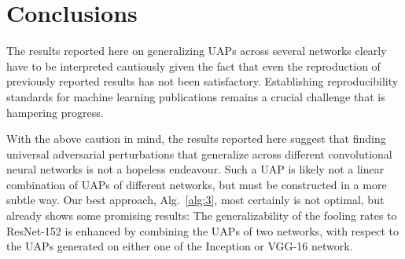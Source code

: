 \documentclass[runningheads]{llncs}
\begin{document}
\section{Conclusions}
The results reported here on generalizing UAPs across several networks clearly have to be interpreted cautiously given the fact that even the reproduction of previously reported results has not been satisfactory. Establishing reproducibility standards for machine learning publications remains a crucial challenge that is hampering progress.

With the above caution in mind, the results reported here suggest that finding universal adversarial perturbations that generalize across different convolutional neural networks is not a hopeless endeavour. Such a UAP is likely not a linear combination of UAPs of different networks, but must be constructed in a more subtle way. Our best approach, Alg.~\ref{alg:3}, most certainly is not optimal, but already shows some promising results: The generalizability of the fooling rates to ResNet-152 is enhanced by combining the UAPs of two networks, with respect to the UAPs generated on either one of the Inception or VGG-16 network.



\end{document}
